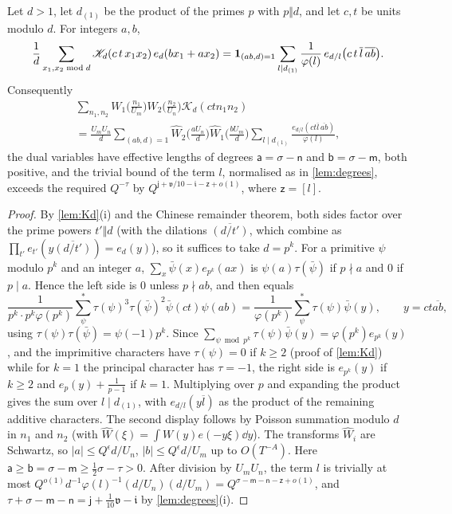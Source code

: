 \documentclass[11pt,colorlinks]{charlie}
\begin{document}
\begin{lemma}\label{lem:doublepoisson}
Let $d>1$, let $d_{(1)}$ be the product of the primes $p$ with $p\Vert d$, and let $c,t$ be units modulo $d$. For integers $a,b$,
\[
 \frac1d\sum_{x_1,x_2\bmod d}\mathscr K_d(c\,t\,x_1x_2)\,e_d(bx_1+ax_2)=\mathbf{1}_{(ab,d)=1}\sum_{l\mid d_{(1)}}\frac1{\varphi(l)}\,e_{d/l}\big(c\,t\,\overline l\,\overline{ab}\big).
\]
Consequently
\begin{multline*}
 \sum_{n_1,n_2}W_1\Big(\frac{n_1}{U_m}\Big)W_2\Big(\frac{n_2}{U_n}\Big)\mathscr K_d(ctn_1n_2)\\
 =\frac{U_mU_n}d\sum_{(ab,d)=1}\widehat W_2\Big(\frac{aU_n}d\Big)\widehat W_1\Big(\frac{bU_m}d\Big)\sum_{l\mid d_{(1)}}\frac{e_{d/l}(ct\overline l\,\overline{ab})}{\varphi(l)},
\end{multline*}
the dual variables have effective lengths of degrees $\mathsf a=\sigma-\mathsf n$ and $\mathsf b=\sigma-\mathsf m$, both positive, and the trivial bound of the term $l$, normalised as in \cref{lem:degrees}, exceeds the required $Q^{-\tau}$ by $Q^{\mathsf j+\mathfrak v/10-\mathfrak i-\mathsf z+o(1)}$, where $\mathsf z=[l]$.
\end{lemma}
\begin{proof}
By \cref{lem:Kd}(i) and the Chinese remainder theorem, both sides factor over the prime powers $t'\Vert d$ (with the dilations $\overline{(d/t')}$, which combine as $\prod_{t'}e_{t'}(y\overline{(d/t')})=e_d(y)$), so it suffices to take $d=p^k$. For a primitive $\psi$ modulo $p^k$ and an integer $a$, $\sum_{x}\bar\psi(x)e_{p^k}(ax)$ is $\psi(a)\tau(\bar\psi)$ if $p\nmid a$ and $0$ if $p\mid a$. Hence the left side is $0$ unless $p\nmid ab$, and then equals
\[
 \frac1{p^k\cdot p^k\varphi(p^k)}\sum_\psi^*\tau(\psi)^3\tau(\bar\psi)^2\bar\psi(ct)\psi(ab)=\frac1{\varphi(p^k)}\sum_\psi^*\tau(\psi)\bar\psi(y),\qquad y=ct\overline{ab},
\]
using $\tau(\psi)\tau(\bar\psi)=\psi(-1)p^k$. Since $\sum_{\psi\bmod p^k}\tau(\psi)\bar\psi(y)=\varphi(p^k)e_{p^k}(y)$, and the imprimitive characters have $\tau(\psi)=0$ if $k\ge2$ (proof of \cref{lem:Kd}) while for $k=1$ the principal character has $\tau=-1$, the right side is $e_{p^k}(y)$ if $k\ge2$ and $e_p(y)+\frac1{p-1}$ if $k=1$. Multiplying over $p$ and expanding the product gives the sum over $l\mid d_{(1)}$, with $e_{d/l}(y\overline l)$ as the product of the remaining additive characters. The second display follows by Poisson summation modulo $d$ in $n_1$ and $n_2$ (with $\widehat W(\xi)=\int W(y)e(-y\xi)\dd y$). The transforms $\widehat W_i$ are Schwartz, so $|a|\le Q^{\epsilon}d/U_n$, $|b|\le Q^\epsilon d/U_m$ up to $O(T^{-A})$. Here $\mathsf a\ge\mathsf b=\sigma-\mathsf m\ge\frac12\sigma-\tau>0$. After division by $U_mU_n$, the term $l$ is trivially at most $Q^{o(1)}d^{-1}\varphi(l)^{-1}(d/U_n)(d/U_m)=Q^{\sigma-\mathsf m-\mathsf n-\mathsf z+o(1)}$, and $\tau+\sigma-\mathsf m-\mathsf n=\mathsf j+\frac1{10}\mathfrak v-\mathfrak i$ by \cref{lem:degrees}(i).
\end{proof}
\end{document}

